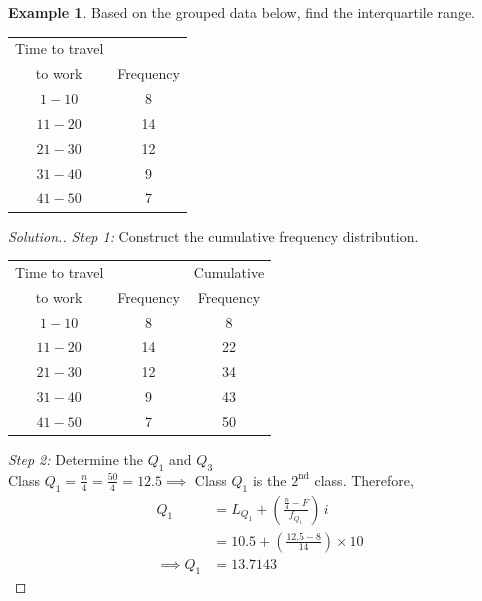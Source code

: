 \documentclass[11pt,a4paper]{article}
\theoremstyle{definition}
\newtheorem{example}[thm]{Example}
\newenvironment{solution}
  {\renewcommand{\qedsymbol}{}\begin{proof}[\textit{Solution}.]}
  {\end{proof}}
\begin{document}
\begin{example}
Based on the grouped data below, find the interquartile range.
\begin{table}[H]
\centering
\begin{tabular}{|c|c|}
\hline
Time to travel & \\
to work        & Frequency\\
\hline
$1 - 10$ & 8\\
$11 - 20$ & 14\\
$21 - 30$ & 12\\
$31 - 40$ & 9\\
$41 - 50$ & 7\\
\hline
\end{tabular}
\end{table}
\vspace{0.5cm}
\end{example}





\begin{solution}
\textit{Step 1:} Construct the cumulative frequency distribution.


\begin{table}[H]
\centering
\begin{tabular}{|c|c|c|}
\hline
Time to travel &  & Cumulative\\
to work        & Frequency & Frequency\\
\hline
$1 - 10$ & 8    & 8\\
$11 - 20$ & 14  & 22\\
$21 - 30$ & 12  & 34\\
$31 - 40$ & 9   & 43\\
$41 - 50$ & 7   & 50\\
\hline
\end{tabular}
\end{table}


\textit{Step 2:} Determine the $Q_1$ and $Q_3$\\

Class ${Q_1 = \frac{n}{4} = \frac{50}{4}=12.5}\implies$ Class $Q_1$ is the $2^{\text{nd}}$ class.  Therefore,
\begin{align*}
Q_1 & = L_{Q_1} + \left(\frac{\frac{n}{4}-F}{f_{Q_1}}\right)\, i\\[1ex]
    & = 10.5 + \left(\frac{12.5-8}{14}\right)\times 10\\[1ex]
\implies Q_1 & = 13.7143
\end{align*}
\end{solution}
\end{document}
